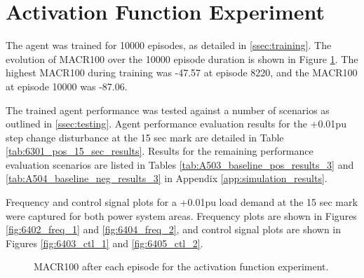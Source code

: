 \section{Activation Function Experiment}
The agent was trained for 10000 episodes, as detailed in \textsection \ref{ssec:training}. The evolution of MACR100 over the 10000 episode duration is shown in Figure \ref{fig:6401_average_reward}. The highest MACR100 during training was -47.57 at episode 8220, and the MACR100 at episode 10000 was -87.06.

The trained agent performance was tested against a number of scenarios as outlined in \textsection \ref{ssec:testing}. Agent performance evaluation results for the +0.01pu step change disturbance at the 15 sec mark are detailed in Table \ref{tab:6301_pos_15_sec_results}. Results for the remaining performance evaluation scenarios are listed in Tables \ref{tab:A503_baseline_pos_results_3} and \ref{tab:A504_baseline_neg_results_3} in Appendix \ref{app:simulation_results}.

Frequency and control signal plots for a +0.01pu load demand at the 15 sec mark were captured for both power system areas. Frequency plots are shown in Figures \ref{fig:6402_freq_1} and \ref{fig:6404_freq_2}, and control signal plots are shown in Figures \ref{fig:6403_ctl_1} and \ref{fig:6405_ctl_2}.

\begin{figure}[h]
	\centering
	
	\caption{MACR100 after each episode for the activation function experiment.}\label{fig:6401_average_reward}
\end{figure}



